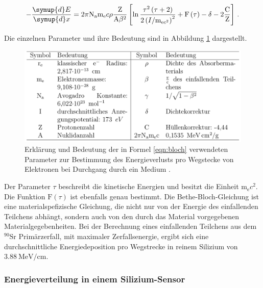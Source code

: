 \begin{equation}
    - \frac{\symup{d}E}{\symup{d}x} = 2 \pi \text{N}_\text{a} \text{m}_\text{e} c \rho \frac{\text{Z}}{\text{A} \beta^2}
    \left[\ln{\frac{\tau^2 \left(\tau + 2 \right)}{2 \left(I / \text{m}_{\text{e} c^2} \right)^2}}
    + \text{F}\left(\tau \right) - \delta - 2 \frac{\text{C}}{\text{Z}} \right] \, .
\label{eqn:bloch}
\end{equation}

Die einzelnen Parameter und ihre Bedeutung sind in Abbildung \ref{fig:TabelleBloch} dargestellt.

\begin{figure}
  \centering
  \includegraphics[width=\textwidth]{content/graphics/Bloch.png}
  \caption{Erklärung und Bedeutung der in Formel \eqref{eqn:bloch} verwendeten
  Parameter zur Bestimmung des Energieverlusts pro Wegstecke von Elektronen
  bei Durchgang durch ein Medium \cite{Anleitung}.}
  \label{fig:TabelleBloch}
\end{figure}

Der Parameter $\tau$ beschreibt die kinetische Energien und besitzt die Einheit $\text{m}_\text{e} c^2$.
Die Funktion $ \text{F}\left(\tau \right)$ ist ebenfalls genau bestimmt.
Die Bethe-Bloch-Gleichung ist eine materialspefizische Gleichung, die nicht nur
von der Energie des einfallenden Teilchens abhängt, sondern auch von den durch das
Material vorgegebenen Materialgegebenheiten. Bei der Berechnung eines
einfallenden Teilchens aus dem $^{90}\text{Sr}$ Primärzerfall, mit maximaler
Zerfallsenergie, ergibt sich eine durchschnittliche Energiedeposition pro
Wegstrecke in reinem Silizium von $\SI{3.88}{\mega\electronvolt\per\centi\meter}$.

\subsubsection{Energieverteilung in einem Silizium-Sensor}

